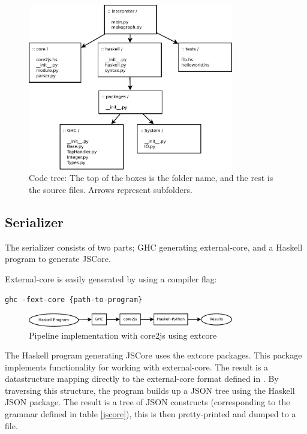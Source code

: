 \begin{figure}[H]
\centering
\includegraphics[width=0.8\textwidth]{diags/organization}
\caption{Code tree: The top of the boxes is the folder name, and the rest is the source 
files. Arrows represent subfolders.}
\label{organization}
\end{figure}

\subsection{Serializer}

The serializer consists of two parts; GHC generating external-core, and 
a Haskell program to generate JSCore.

External-core is easily generated by using a compiler flag:
\begin{lstlisting}
ghc -fext-core {path-to-program}
\end{lstlisting}

\begin{figure}[H]
\centering
\includegraphics[width=0.8\textwidth]{diags/pipe_w_core2js}
\caption{Pipeline implementation with core2js using extcore}
\label{core2js}
\end{figure}

The Haskell program generating JSCore uses the extcore packages. This package
implements functionality for working with external-core. The result is a datastructure
mapping directly to the external-core format defined in \cite{tolmach2010ghc}. By traversing
this structure, the program builds up a JSON tree using the Haskell JSON package.
The result is a tree of JSON constructs (corresponding to the grammar defined in table \ref{jscore}), 
this is then pretty-printed and dumped to a file.

